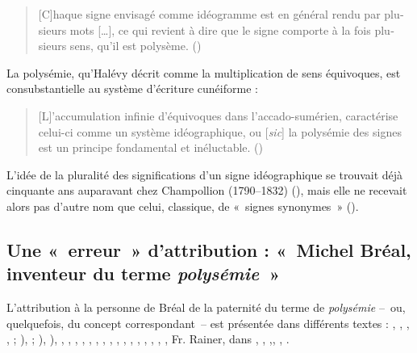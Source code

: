 \documentclass[output=paper]{langsci/langscibook}
\begin{document}
\begin{otherlanguage}{french}
\begin{quote}
[C]haque signe envisagé comme idéogramme est en général rendu par plusieurs mots […], ce qui revient à dire que le signe comporte à la fois plusieurs sens, qu’il est polysème. (\citealt[275]{halevy_melanges_1883})
\end{quote}

La polysémie, qu’Halévy décrit comme la multiplication de sens équivoques, est consubstantielle au système d’écriture cunéiforme :

\begin{quote}
    [L]’accumulation infinie d’équivoques dans l’accado-sumérien, caractérise celui-ci comme un système idéographique, ou [\textit{sic}] la polysémie des signes est un principe fondamental et inéluctable. (\citealt[276]{halevy_melanges_1883})
\end{quote}

L’idée de la pluralité des significations d’un signe idéographique se trouvait déjà cinquante ans auparavant chez Champollion (1790--1832) (\citealt[311--312]{champollion_precis_1828}), mais elle ne recevait alors pas d’autre nom que celui, classique, de «~signes synonymes~» (\citealt[314]{champollion_precis_1828}).

\subsection{Une «~erreur~» d’attribution : «~Michel Bréal, inventeur du terme \textit{polysémie~}»}

L’attribution à la personne de Bréal de la paternité du terme de \textit{polysémie}  –~ou, quelquefois, du concept correspondant~– est présentée dans différents textes : \citet[15]{firth_technique_1957}, \citet[199]{ullmann_precis_1952}, \citet[147]{ricoeur_metaphore_1975}, \citet[286]{delesalle_linguistique_1986}, \citet[89]{delesalle_statut_1986}; \citeyear[300--305]{delesalle_vie_1987}), \citet[22] {nerlich_avant-propos_1993}; \citeyear[1625]{nerlich_study_2001}), \citet[169--170]{peeters_verbe_1993}), \citet{peeters_compte_1994}, \citet[27]{desmet_grammaire_1995}, \citet[118]{branca-rosoff_polysemie_1996}, \citet[11]{victorri_polysemie._1996}, \citet[16]{surcin_expression_1999}, \citet[215]{auroux_semantique_2000}, \citet[156]{siblot_emission_2000}, \citet[4]{nerlich_polysemy:_2003}, \citet[131]{girardin_polysemie_2004}, \citet[51]{piron_analyse_2006}, \citet[55]{cusimano_essai_2008}, \citet[22]{larrivee_histoire_2008}, \citet[116]{thibault_traitement_2009}, \citet[10]{mazaleyrat_vers_2010}, \citet[23]{pauly_polysemie._2010}, \citet[n. p.]{jakimovska_terminologie_2012}, Fr. Rainer, dans \citet{lieber_oxford_2014}, \citet[59]{derradji_forme_2014}, \citet[6]{sorba_presentation_2014},\citet[23]{bisconti_sens_2016}, \citet[4]{bruns_polysemie_2016}, \citet[103]{de_palo_invention_2016}.


\end{otherlanguage}
\end{document}
